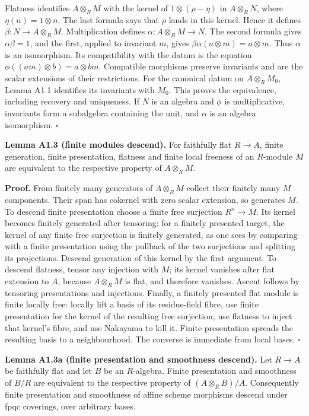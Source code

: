 \documentclass[11pt,a4paper,openany]{report}
\begin{document}
Flatness identifies \(A\otimes_R M\) with the kernel of \(1\otimes(\rho-\eta)\) in \(A\otimes_R N\), where \(\eta(n)=1\otimes n\). The last formula says that \(\rho\) lands in this kernel. Hence it defines \(\beta:N\to A\otimes_R M\). Multiplication defines \(\alpha:A\otimes_R M\to N\). The second formula gives \(\alpha\beta=1\), and the first, applied to invariant \(m\), gives \(\beta\alpha(a\otimes m)=a\otimes m\). Thus \(\alpha\) is an isomorphism. Its compatibility with the datum is the equation \(\phi((am)\otimes b)=a\otimes bm\). Compatible morphisms preserve invariants and are the scalar extensions of their restrictions. For the canonical datum on \(A\otimes_R M_0\), Lemma A1.1 identifies its invariants with \(M_0\). This proves the equivalence, including recovery and uniqueness. If \(N\) is an algebra and \(\phi\) is multiplicative, invariants form a subalgebra containing the unit, and \(\alpha\) is an algebra isomorphism. \(\square\)

\textbf{Lemma A1.3 (finite modules descend).} For faithfully flat \(R\to A\), finite generation, finite presentation, flatness and finite local freeness of an \(R\)-module \(M\) are equivalent to the respective property of \(A\otimes_R M\).

\textbf{Proof.} From finitely many generators of \(A\otimes_R M\) collect their finitely many \(M\) components. Their span has cokernel with zero scalar extension, so generates \(M\). To descend finite presentation choose a finite free surjection \(R^n\to M\). Its kernel becomes finitely generated after tensoring: for a finitely presented target, the kernel of any finite free surjection is finitely generated, as one sees by comparing with a finite presentation using the pullback of the two surjections and splitting its projections. Descend generation of this kernel by the first argument. To descend flatness, tensor any injection with \(M\); its kernel vanishes after flat extension to \(A\), because \(A\otimes_R M\) is flat, and therefore vanishes. Ascent follows by tensoring presentations and injections. Finally, a finitely presented flat module is finite locally free: locally lift a basis of its residue-field fibre, use finite presentation for the kernel of the resulting free surjection, use flatness to inject that kernel's fibre, and use Nakayama to kill it. Finite presentation spreads the resulting basis to a neighbourhood. The converse is immediate from local bases. \(\square\)

\textbf{Lemma A1.3a (finite presentation and smoothness descend).} Let \(R\to A\) be faithfully flat and let \(B\) be an \(R\)-algebra. Finite presentation and smoothness of \(B/R\) are equivalent to the respective property of \((A\otimes_R B)/A\). Consequently finite presentation and smoothness of affine scheme morphisms descend under fpqc coverings, over arbitrary bases.
\end{document}
